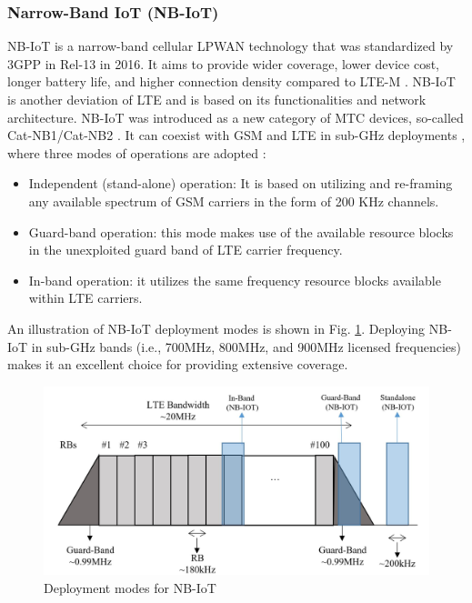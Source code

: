 \documentclass[]{IEEEtran}
\begin{document}
\subsubsection{Narrow-Band IoT (NB-IoT)}
\label{sec:2-2-1}
NB-IoT is a narrow-band cellular LPWAN technology that was standardized by 3GPP in Rel-13 in 2016\cite{TR_45.820}. It aims to provide wider coverage, lower device cost, longer battery life, and higher connection density compared to LTE-M \cite{ding_iot_2020}. NB-IoT is another deviation of LTE and is based on its functionalities and network architecture. NB-IoT was introduced as a new category of MTC devices, so-called Cat-NB1/Cat-NB2 \cite{liberg_cellular_2019}. It can coexist with GSM and LTE in sub-GHz deployments \cite{chaudhari2020lpwan}, where three modes of operations are adopted \cite{chen2017narrow,chettri_comprehensive_2020_1}:
 \begin{itemize}
     \item Independent (stand-alone) operation: It is based on utilizing and re-framing any available spectrum of GSM carriers in the form of 200 KHz channels.
     \item Guard-band operation: this mode makes use of the available resource blocks in the unexploited guard band of LTE carrier frequency.
     \item In-band operation: it utilizes the same frequency resource blocks available within LTE carriers. 
 \end{itemize}
An illustration of NB-IoT deployment modes is shown in Fig. \ref{fig:NB-IoT-deployments}. Deploying NB-IoT in sub-GHz bands (i.e., 700MHz, 800MHz, and 900MHz licensed frequencies) makes it an excellent choice for providing extensive coverage. 
\begin{figure}
    \centering
        \includegraphics[width=\linewidth]{Pictures/Deployments supported by NB-IoT.png}
    \caption{Deployment modes for NB-IoT}
    \label{fig:NB-IoT-deployments}
\end{figure}
\end{document}
